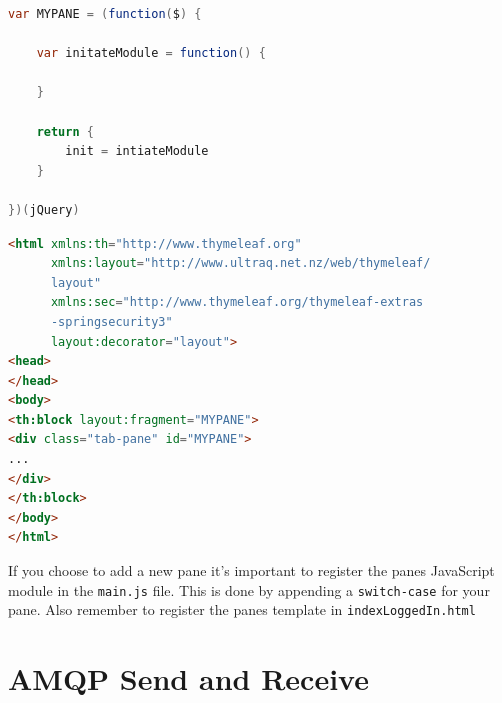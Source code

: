 \begin{lstlisting}[language=Java, captionpos=b, caption=Skeleton for a JavaScript module, frame=bt, showstringspaces=false]
var MYPANE = (function($) { 

    var initateModule = function() {
    
    }

    return {
        init = intiateModule
    }

})(jQuery)
\end{lstlisting}

\begin{lstlisting}[language=HTML, captionpos=b, caption=Skeleton for a Thymeleaf-template, frame=bt, showstringspaces=false]
<html xmlns:th="http://www.thymeleaf.org"
      xmlns:layout="http://www.ultraq.net.nz/web/thymeleaf/
      layout"
      xmlns:sec="http://www.thymeleaf.org/thymeleaf-extras
      -springsecurity3"
      layout:decorator="layout">
<head>
</head>
<body>
<th:block layout:fragment="MYPANE">
<div class="tab-pane" id="MYPANE">
...
</div>
</th:block>
</body>
</html>
\end{lstlisting}

If you choose to add a new pane it's important to register the panes JavaScript module in the \verb!main.js! file. This is done by appending a \verb!switch-case! for your pane. Also remember to register the panes template in \verb!indexLoggedIn.html!

\section{AMQP Send and Receive}

\clearpage